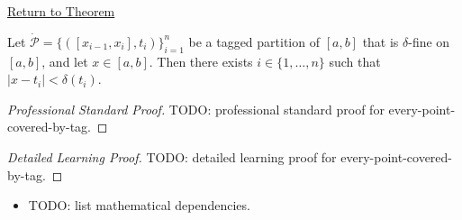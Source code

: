 \newpage
{}
\label{prf:every-point-covered-by-tag}

\begin{remark*}[Return]
\hyperref[lem:every-point-covered-by-tag]{Return to Theorem}
\end{remark*}

\begin{theorem*}
Let $\dot{\mathcal{P}}=\{([x_{i-1},x_i],t_i)\}_{i=1}^n$ be a tagged partition of $[a,b]$ that is $\delta$-fine on $[a,b]$, and let $x\in[a,b]$. Then there exists $i\in\{1,\ldots,n\}$ such that $|x-t_i|<\delta(t_i)$.
\end{theorem*}

\begin{proof}[Professional Standard Proof]
\LRAProofBodyStart
TODO: professional standard proof for every-point-covered-by-tag.
\end{proof}

\begin{proof}[Detailed Learning Proof]
\LRAProofBodyStart
TODO: detailed learning proof for every-point-covered-by-tag.
\end{proof}

\begin{remark*}
\end{remark*}

\begin{dependencies}
\begin{itemize}
  \item TODO: list mathematical dependencies.
\end{itemize}
\end{dependencies}

\clearpage
